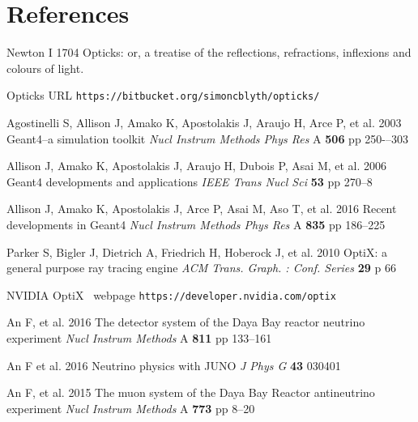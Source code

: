 \documentclass[a4paper]{jpconf}
\begin{document}
\newpage
\section*{References}
\begin{thebibliography}{9}

Newton I 
1704 
Opticks: or, a treatise of the reflections, refractions, inflexions and colours of light.

Opticks URL {\tt https://bitbucket.org/simoncblyth/opticks/}

Agostinelli S, Allison J, Amako K, Apostolakis J, Araujo H, Arce P, et al. 
2003  
Geant4--a simulation toolkit 
{\it Nucl Instrum Methods Phys Res} A {\bf 506} pp 250-–303 

Allison J, Amako K, Apostolakis J, Araujo H, Dubois P, Asai M, et al. 
2006 
Geant4 developments and applications 
{\it IEEE Trans Nucl Sci} {\bf 53} pp 270--8

Allison J, Amako K, Apostolakis J, Arce P, Asai M, Aso T, et al. 
2016 
Recent developments in Geant4 
{\it Nucl Instrum Methods Phys Res} A {\bf 835} pp 186--225

Parker S, Bigler J, Dietrich A, Friedrich H, Hoberock J, et al.
2010 
OptiX: a general purpose ray tracing engine
{\it ACM Trans. Graph. : Conf. Series} {\bf 29} p 66 

NVIDIA{\textregistered} OptiX\texttrademark~ webpage {\tt https://developer.nvidia.com/optix}



An F, et al.
2016
The detector system of the Daya Bay reactor neutrino experiment
{\it Nucl Instrum Methods} A {\bf 811} pp 133--161

An F et al.  
2016
Neutrino physics with JUNO
{\it J Phys G} {\bf 43} 030401

An F, et al.
2015
The muon system of the Daya Bay Reactor antineutrino experiment
{\it Nucl Instrum Methods} A {\bf 773} pp 8--20




\end{thebibliography}
\end{document}
